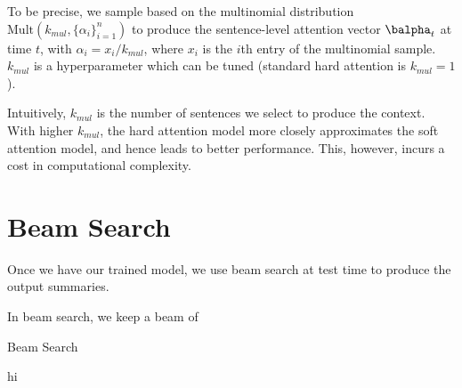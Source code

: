 \documentclass[12pt]{report}
\begin{document}
To be precise, we sample based on the multinomial distribution $\mathrm{Mult}(k_{mul}, \{\alpha_i\}_{i=1}^n)$ to produce the sentence-level attention vector $\balpha_t$ at time $t$, with $\alpha_i = x_i / k_{mul}$, where $x_i$ is the $i$th entry of the multinomial sample. $k_{mul}$ is a hyperparameter which can be tuned (standard hard attention is $k_{mul} = 1$).

Intuitively, $k_{mul}$ is the number of sentences we select to produce the context. With higher $k_{mul}$, the hard attention model more closely approximates the soft attention model, and hence leads to better performance. This, however, incurs a cost in computational complexity.

\section{Beam Search}

Once we have our trained model, we use beam search at test time to produce the output summaries.

In beam search, we keep a beam of 

\begin{algorithm}[b]
\caption{Beam Search}
\label{alg:beam_search}
\begin{algorithmic}
\State hi
\end{algorithmic}
\end{algorithm}






%
%
\end{document}
